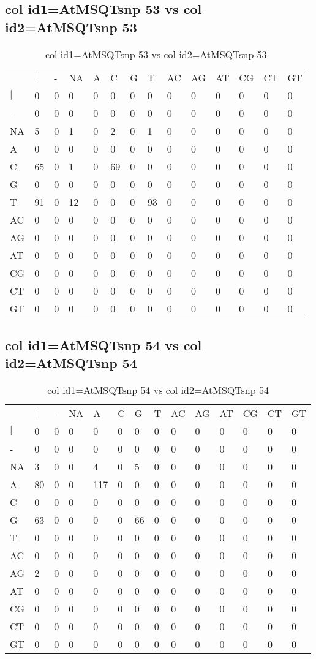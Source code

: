 \subsection{col id1=AtMSQTsnp 53 vs col id2=AtMSQTsnp 53}
\begin{center}
\begin{longtable}{|l|l|l|l|l|l|l|l|l|l|l|l|l|l|}
\caption{col id1=AtMSQTsnp 53 vs col id2=AtMSQTsnp 53} \label{table_dm936}\\
\hline
\\
\hline
&$|$&-&NA&A&C&G&T&AC&AG&AT&CG&CT&GT\\
$|$&0&0&0&0&0&0&0&0&0&0&0&0&0\\
-&0&0&0&0&0&0&0&0&0&0&0&0&0\\
NA&5&0&1&0&2&0&1&0&0&0&0&0&0\\
A&0&0&0&0&0&0&0&0&0&0&0&0&0\\
C&65&0&1&0&69&0&0&0&0&0&0&0&0\\
G&0&0&0&0&0&0&0&0&0&0&0&0&0\\
T&91&0&12&0&0&0&93&0&0&0&0&0&0\\
AC&0&0&0&0&0&0&0&0&0&0&0&0&0\\
AG&0&0&0&0&0&0&0&0&0&0&0&0&0\\
AT&0&0&0&0&0&0&0&0&0&0&0&0&0\\
CG&0&0&0&0&0&0&0&0&0&0&0&0&0\\
CT&0&0&0&0&0&0&0&0&0&0&0&0&0\\
GT&0&0&0&0&0&0&0&0&0&0&0&0&0\\
\hline
\end{longtable}
\end{center}

\subsection{col id1=AtMSQTsnp 54 vs col id2=AtMSQTsnp 54}
\begin{center}
\begin{longtable}{|l|l|l|l|l|l|l|l|l|l|l|l|l|l|}
\caption{col id1=AtMSQTsnp 54 vs col id2=AtMSQTsnp 54} \label{table_dm938}\\
\hline
\\
\hline
&$|$&-&NA&A&C&G&T&AC&AG&AT&CG&CT&GT\\
$|$&0&0&0&0&0&0&0&0&0&0&0&0&0\\
-&0&0&0&0&0&0&0&0&0&0&0&0&0\\
NA&3&0&0&4&0&5&0&0&0&0&0&0&0\\
A&80&0&0&117&0&0&0&0&0&0&0&0&0\\
C&0&0&0&0&0&0&0&0&0&0&0&0&0\\
G&63&0&0&0&0&66&0&0&0&0&0&0&0\\
T&0&0&0&0&0&0&0&0&0&0&0&0&0\\
AC&0&0&0&0&0&0&0&0&0&0&0&0&0\\
AG&2&0&0&0&0&0&0&0&0&0&0&0&0\\
AT&0&0&0&0&0&0&0&0&0&0&0&0&0\\
CG&0&0&0&0&0&0&0&0&0&0&0&0&0\\
CT&0&0&0&0&0&0&0&0&0&0&0&0&0\\
GT&0&0&0&0&0&0&0&0&0&0&0&0&0\\
\hline
\end{longtable}
\end{center}

